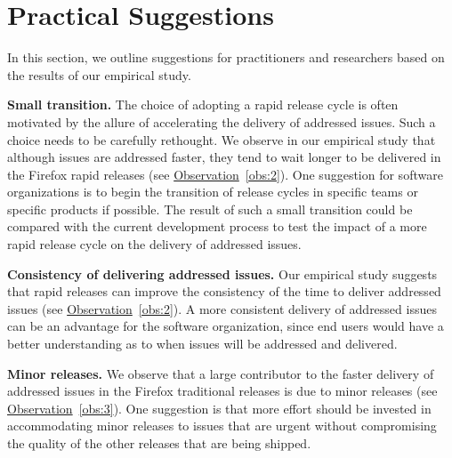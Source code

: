 \section{Practical Suggestions} \label{sec:guidelines}

In this section, we outline suggestions for practitioners and researchers based
on the results of our empirical study.

\begin{description}
	\item \textbf{Small transition.} The choice of adopting a rapid release
		cycle is often motivated by the allure of
		accelerating the delivery of addressed issues. Such a choice needs to be
		carefully rethought. We observe in our empirical study that
		although issues are addressed faster, they tend to wait longer
		to be delivered in the Firefox rapid releases (see
		\hyperref[obs:2]{Observation}~\ref{obs:2}). One
		suggestion for software organizations is to begin the transition
		of release cycles in specific teams or specific products if
		possible. The result of such a small transition could be
		compared with the current development process to test the impact
		of a more rapid release cycle on the
		delivery of addressed issues. \\ 
	\item \textbf{Consistency of delivering addressed issues.} Our empirical
		study suggests that rapid releases can improve the consistency
		of the time to deliver addressed issues (see
		\hyperref[obs:2]{Observation}~\ref{obs:2}). A more consistent
		delivery of addressed issues can be an advantage for the
		software organization, since end users would have a better
		understanding as to when issues will be addressed and delivered. \\
	\item \textbf{Minor releases.} We observe that a large contributor to
		the faster delivery of addressed issues in the Firefox
		traditional releases is due to minor releases (see
		\hyperref[obs:3]{Observation}~\ref{obs:3}). One
		suggestion is that more effort should be invested in
		accommodating minor releases to issues that are urgent without
		compromising the quality of the other releases that are being shipped. \\
\end{description}

